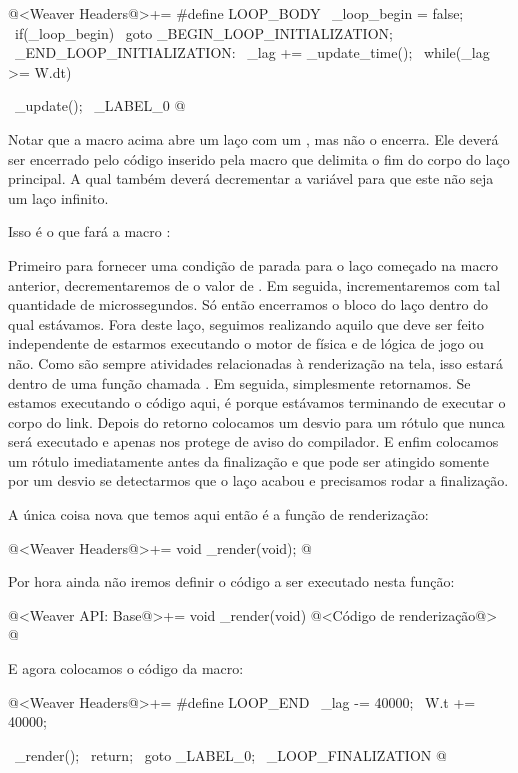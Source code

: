 \iniciocodigo
@<Weaver Headers@>+=
#define LOOP_BODY                                            \
  _loop_begin =  false;                                      \
  if(_loop_begin)                                            \
    goto _BEGIN_LOOP_INITIALIZATION;                         \
_END_LOOP_INITIALIZATION:                                    \
  _lag += _update_time();                                    \
  while(_lag >= W.dt){                                       \
    _update();                                               \
_LABEL_0
@
\fimcodigo

Notar que a macro acima abre um laço com um \monoespaco{while}, mas
não o encerra. Ele deverá ser encerrado pelo código inserido pela
macro que delimita o fim do corpo do laço principal. A qual também
deverá decrementar a variável  para que este não
seja um laço infinito.


Isso é o que fará a macro \monoespaco{LOOP\_END}:

Primeiro para fornecer uma condição de parada para o laço começado na
macro anterior, decrementaremos de \monoespaco{\_lag} o valor
de \monoespaco{W.dt}. Em seguida, incrementaremos  com
tal quantidade de microssegundos. Só então encerramos o bloco do laço
dentro do qual estávamos. Fora deste laço, seguimos realizando aquilo
que deve ser feito independente de estarmos executando o motor de
física e de lógica de jogo ou não. Como são sempre atividades
relacionadas à renderização na tela, isso estará dentro de uma função
chamada \monoespaco{\_render}. Em seguida, simplesmente retornamos. Se
estamos executando o código aqui, é porque estávamos terminando de
executar o corpo do link. Depois do retorno colocamos um desvio para
um rótulo que nunca será executado e apenas nos protege de aviso do
compilador. E enfim colocamos um rótulo imediatamente antes da
finalização e que pode ser atingido somente por um desvio se
detectarmos que o laço acabou e precisamos rodar a finalização.

A única coisa nova que temos aqui então é a função de renderização:

\iniciocodigo
@<Weaver Headers@>+=
void _render(void);
@
\fimcodigo

Por hora ainda não iremos definir o código a ser executado nesta
função:

\iniciocodigo
@<Weaver API: Base@>+=
void _render(void){
  @<Código de renderização@>
}
@
\fimcodigo

E agora colocamos o código da macro:

\iniciocodigo
@<Weaver Headers@>+=
#define LOOP_END                                           \
    _lag -=  40000;                                        \
    W.t +=  40000;                                         \
  }                                                        \
  _render();                                               \
  return;                                                  \
  goto _LABEL_0;                                           \
_LOOP_FINALIZATION
@
\fimcodigo

